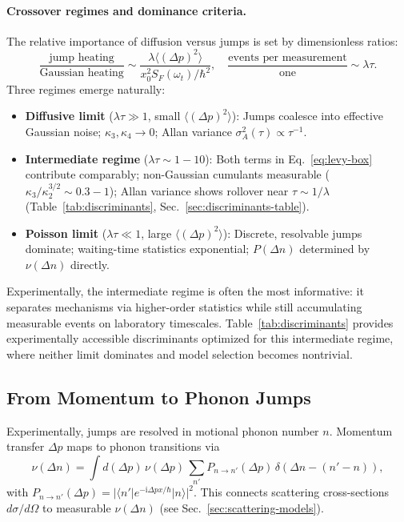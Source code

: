 \paragraph{Crossover regimes and dominance criteria.}
The relative importance of diffusion versus jumps is set by dimensionless ratios:
\begin{equation}
\frac{\text{jump heating}}{\text{Gaussian heating}}
\sim \frac{\lambda \langle (\Delta p)^2 \rangle}{x_0^2 S_F(\omega_t)/\hbar^2},
\quad
\frac{\text{events per measurement}}{\text{one}}
\sim \lambda \tau.
\end{equation}
Three regimes emerge naturally:
\begin{itemize}
\item \textbf{Diffusive limit} ($\lambda \tau \gg 1$, small $\langle(\Delta p)^2\rangle$):
  Jumps coalesce into effective Gaussian noise;
  $\kappa_3, \kappa_4 \to 0$;
  Allan variance $\sigma_A^2(\tau) \propto \tau^{-1}$.
\item \textbf{Intermediate regime} ($\lambda \tau \sim 1{-}10$):
  Both terms in Eq.~\eqref{eq:levy-box} contribute comparably;
  non-Gaussian cumulants measurable ($\kappa_3/\kappa_2^{3/2} \sim 0.3{-}1$);
  Allan variance shows rollover near $\tau \sim 1/\lambda$
  (Table~\ref{tab:discriminants}, Sec.~\ref{sec:discriminants-table}).
\item \textbf{Poisson limit} ($\lambda \tau \ll 1$, large $\langle(\Delta p)^2\rangle$):
  Discrete, resolvable jumps dominate;
  waiting-time statistics exponential;
  $P(\Delta n)$ determined by $\nu(\Delta n)$ directly.
\end{itemize}
Experimentally, the intermediate regime is often the most informative:
it separates mechanisms via higher-order statistics while still accumulating
measurable events on laboratory timescales.
Table~\ref{tab:discriminants} provides experimentally accessible discriminants optimized for this intermediate regime, where neither limit dominates and model selection becomes nontrivial.

\subsection{From Momentum to Phonon Jumps}
Experimentally, jumps are resolved in motional phonon number $n$.
Momentum transfer $\Delta p$ maps to phonon transitions via
\begin{equation}
\nu(\Delta n) = \int d(\Delta p)\,\nu(\Delta p)\,\sum_{n'} P_{n\to n'}(\Delta p)\, \delta(\Delta n-(n'-n)),
\end{equation}
with $P_{n\to n'}(\Delta p)=|\langle n'|e^{-\mathrm{i}\Delta p x/\hbar}|n\rangle|^2$.
This connects scattering cross-sections $d\sigma/d\Omega$ to measurable $\nu(\Delta n)$ (see Sec.~\ref{sec:scattering-models}).

